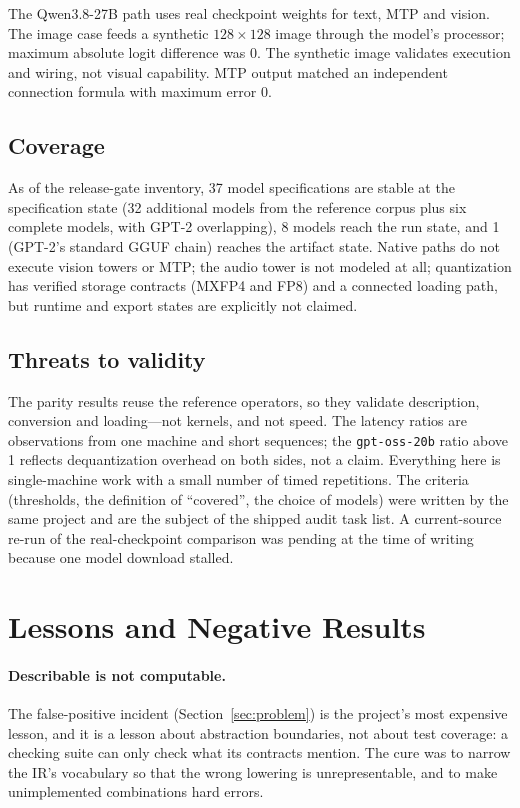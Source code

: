 \documentclass[11pt,a4paper]{article}
\newcommand{\code}[1]{\texttt{#1}}
\newcommand{\q}[1]{\textquotedblleft #1\textquotedblright}
\begin{document}
The Qwen3.8-27B path uses real checkpoint weights for text, MTP and vision.
The image case feeds a synthetic $128\times128$ image through the model's
processor; maximum absolute logit difference was 0. The synthetic image
validates execution and wiring, not visual capability. MTP output matched an
independent connection formula with maximum error 0.

\subsection{Coverage}

As of the release-gate inventory, 37 model specifications are stable at the
specification state (32 additional models from the reference corpus plus six
complete models, with GPT-2 overlapping), 8 models reach the run state, and 1
(GPT-2's standard GGUF chain) reaches the artifact state. Native paths do not
execute vision towers or MTP; the audio tower is not modeled at all;
quantization has verified storage contracts (MXFP4 and FP8) and a connected
loading path, but runtime and export states are explicitly not claimed.

\subsection{Threats to validity}

The parity results reuse the reference operators, so they validate
description, conversion and loading---not kernels, and not speed. The latency
ratios are observations from one machine and short sequences; the
\code{gpt-oss-20b} ratio above 1 reflects dequantization overhead on both
sides, not a claim. Everything here is single-machine work with a small
number of timed repetitions. The criteria (thresholds, the definition of
\q{covered}, the choice of models) were written by the same project and are
the subject of the shipped audit task list. A current-source re-run of the
real-checkpoint comparison was pending at the time of writing because one
model download stalled.

\section{Lessons and Negative Results}
\label{sec:lessons}

\paragraph{Describable is not computable.} The false-positive incident
(Section~\ref{sec:problem}) is the project's most expensive lesson, and it is
a lesson about abstraction boundaries, not about test coverage: a checking
suite can only check what its contracts mention. The cure was to narrow the
IR's vocabulary so that the wrong lowering is unrepresentable, and to make
unimplemented combinations hard errors.
\end{document}
